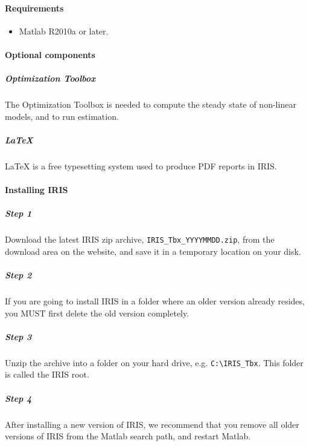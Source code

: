 

	\paragraph{Requirements}\label{requirements}

\begin{itemize}
\itemsep1pt\parskip0pt
\item
  Matlab R2010a or later.
\end{itemize}

\paragraph{Optional components}\label{optional-components}

\subparagraph{Optimization Toolbox}\label{optimization-toolbox}

The Optimization Toolbox is needed to compute the steady state of
non-linear models, and to run estimation.

\subparagraph{LaTeX}\label{latex}

LaTeX is a free typesetting system used to produce PDF reports in IRIS.

\paragraph{Installing IRIS}\label{installing-iris}

\subparagraph{Step 1}\label{step-1}

Download the latest IRIS zip archive, \texttt{IRIS\_Tbx\_YYYYMMDD.zip},
from the download area on the website, and save it in a temporary
location on your disk.

\subparagraph{Step 2}\label{step-2}

If you are going to install IRIS in a folder where an older version
already resides, you MUST first delete the old version completely.

\subparagraph{Step 3}\label{step-3}

Unzip the archive into a folder on your hard drive, e.g.
\texttt{C:\textbackslash{}IRIS\_Tbx}. This folder is called the IRIS
root.

\subparagraph{Step 4}\label{step-4}

After installing a new version of IRIS, we recommend that you remove all
older versions of IRIS from the Matlab search path, and restart Matlab.

